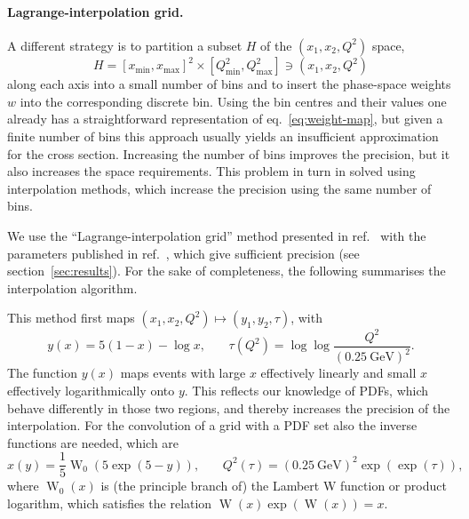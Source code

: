 \paragraph{Lagrange-interpolation grid.}
A different strategy is to partition a subset $H$ of the $(x_1, x_2, Q^2)$ space,
\begin{equation}
H = [x_\mathrm{min},x_\mathrm{max}]^2 \times [Q^2_\mathrm{min}, Q^2_\mathrm{max}] \ni (x_1, x_2, Q^2)
\end{equation}
along each axis into a small number of bins and to insert the phase-space weights $w$ into the corresponding discrete bin.
Using the bin centres and their values one already has a straightforward representation of eq.~\eqref{eq:weight-map}, but given a finite number of bins this approach usually yields an insufficient approximation for the cross section.
Increasing the number of bins improves the precision, but it also increases the space requirements.
This problem in turn in solved using interpolation methods, which increase the precision using the same number of bins.

We use the \enquote{Lagrange-interpolation grid} method presented in ref.~\cite{Carli:2010rw} with the parameters published in ref.~\cite{Bertone:2014zva}, which give sufficient precision (see section~\ref{sec:results}).
For the sake of completeness, the following summarises the interpolation algorithm.

This method first maps $(x_1, x_2, Q^2) \mapsto (y_1, y_2, \tau)$, with
\begin{equation}
y(x) = 5 (1-x) - \log x \text{,} \qquad \tau (Q^2) = \log \log \frac{Q^2}{(\SI{0.25}{\giga\electronvolt})^2} \text{.}
\label{eq:maps}
\end{equation}
The function $y(x)$ maps events with large $x$ effectively linearly and small $x$ effectively logarithmically onto $y$.
This reflects our knowledge of PDFs, which behave differently in those two regions, and thereby increases the precision of the interpolation.
For the convolution of a grid with a PDF set also the inverse functions are needed, which are
\begin{equation}
x(y) = \frac{1}{5} \operatorname{W}_0 (5 \exp (5-y)) \text{,} \qquad Q^2 (\tau) = (\SI{0.25}{\giga\electronvolt})^2 \exp (\exp (\tau)) \text{,}
\end{equation}
where $\operatorname{W}_0 (x)$ is (the principle branch of) the Lambert W function or product logarithm, which satisfies the relation $\operatorname{W} (x) \exp (\operatorname{W} (x)) = x$.

